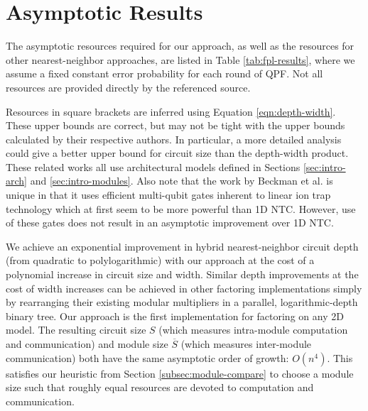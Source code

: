 \section{Asymptotic Results}
\label{sec:fpl-results}

The asymptotic resources required for our approach,
as well as the resources for other nearest-neighbor approaches,
are listed in Table \ref{tab:fpl-results},
where we assume a fixed constant error
probability for each round of QPF. Not all resources are
provided directly by the referenced source.

Resources in square brackets
are inferred using Equation \ref{eqn:depth-width}.
These upper bounds are correct,
but may not be tight with the upper bounds
calculated by their respective authors.
In particular, a more detailed analysis
could give a better upper bound for circuit size than the
depth-width product.
These related works all use architectural models defined in
Sections \ref{sec:intro-arch} and \ref{sec:intro-modules}.
 Also note that the
work by Beckman et al. \cite{Beckman1996} is unique in that it uses
efficient multi-qubit gates inherent to linear ion trap technology which
at first seem to
be more powerful than \textsf{1D NTC}. However, use of these gates does not
result in an asymptotic improvement over \textsf{1D NTC}.

We achieve an exponential
improvement in hybrid nearest-neighbor circuit depth (from quadratic to polylogarithmic)
with our approach at the cost of a polynomial increase in
circuit size and width.
Similar depth improvements at the cost of width increases can be achieved
in other factoring implementations simply by rearranging their
existing modular multipliers in a parallel, logarithmic-depth binary tree.
Our approach is the first implementation for factoring on any
\textsc{2D} model. The resulting circuit size $S$ (which measures
intra-module computation and communication) and module size $\overline{S}$
(which measures inter-module communication)
both have the same asymptotic order of growth: $O(n^4)$. This satisfies
our heuristic from Section \ref{subsec:module-compare} to choose
a module size such that roughly equal resources are devoted to
computation and communication.


